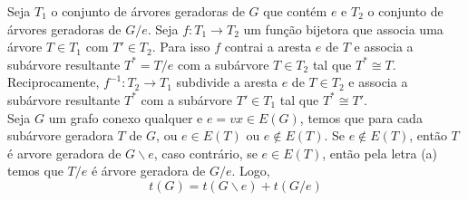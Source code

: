 
 Seja $T_1$ o conjunto de árvores geradoras de $G$ que contém $e$ e
$T_2$ o conjunto de árvores geradoras de $G/e$. Seja $f: T_1 \to T_2$ um função
bijetora  que associa uma árvore $T \in T_1$ com $T' \in T_2$. Para isso $f$
contrai a aresta $e$ de $T$ e associa a subárvore resultante $T^* = T/e$ com a
subárvore $T \in T_2$ tal que $T^* \cong T$. Reciprocamente, $f^{-1}: T_2 \to
T_1$ subdivide a aresta $e$ de $T \in T_2$ e associa a subárvore resultante $T^*$ com a subárvore $T' \in T_1$ tal que $T^* \cong T'$.\\

 Seja $G$ um grafo conexo qualquer e $e = vx \in E(G)$, temos que para cada subárvore geradora $T$ de $G$, ou $e \in E(T)$ ou $e \notin E(T)$.
%
Se $e \notin E(T)$, então $T$ é arvore geradora de $G\backslash e$, caso contrário, se $e \in E(T)$, então pela letra (a) temos que $T/e$ é árvore geradora de $G/e$.
%
Logo, $$t(G) = t(G\backslash e) + t(G/e)$$
